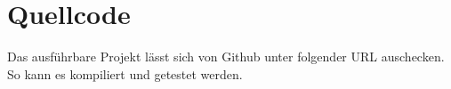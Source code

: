 \section{Quellcode}
Das ausführbare Projekt lässt sich von Github unter folgender URL\cite{Schmidt:repoCode} auschecken. So kann es kompiliert und getestet werden. 

